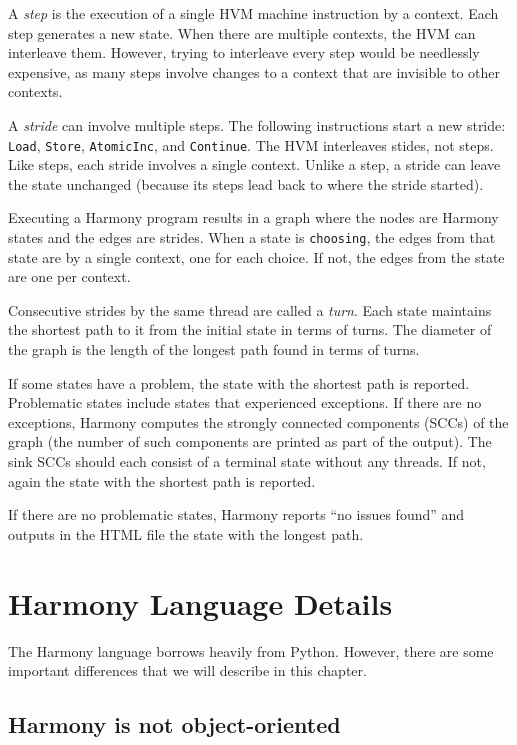 \documentclass{report}
\begin{document}
A \emph{step} is the execution of a single HVM machine instruction
by a context.
Each step generates a new state.
When there are multiple contexts, the HVM can interleave them.
However, trying to interleave every step would be needlessly expensive,
as many steps involve changes to a context that are invisible to
other contexts.

A \emph{stride}
%
can involve multiple steps.  The following
instructions start a new stride: \texttt{Load}, \texttt{Store},
\texttt{AtomicInc}, and \texttt{Continue}.  The HVM
interleaves stides, not steps.  Like steps, each
stride involves a single context.  Unlike a step, a stride
can leave the state unchanged (because its steps lead back
to where the stride started).

Executing a Harmony program results in a graph where the nodes are Harmony
states and the edges are strides.
When a state is \texttt{choosing}, the edges from that state are
by a single context, one for each choice.  If not, the edges from
the state are one per context.

Consecutive strides by the same thread are called a \emph{turn}.
Each state maintains the shortest path to it from the initial state in terms
of turns.
The diameter of the graph is the length of the longest path found in
terms of turns.

If some states have a problem, the state with the shortest path is reported.
Problematic states include states that experienced exceptions.
If there are no exceptions, Harmony computes the strongly connected components (SCCs)
of the graph (the number of such components are printed as part of the output).
The sink SCCs should each consist of a terminal state without any threads.
If not, again the state with the shortest path is reported.

If there are no problematic states, Harmony reports ``no issues found'' and outputs
in the HTML file the state with the longest path.

\chapter{Harmony Language Details}
\label{ap:details}

The Harmony language borrows heavily from Python.  However, there are
some important differences that we will describe in this chapter.

\section{Harmony is not object-oriented}
\end{document}
